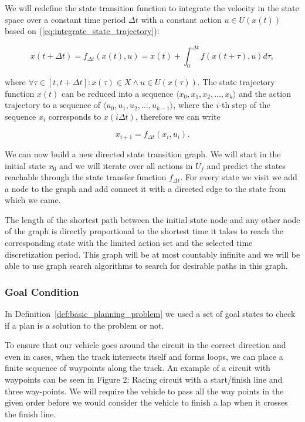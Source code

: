 We will redefine the state transition function to integrate the velocity in the state space over a constant time period $\Delta t$ with a constant action $u\in U(x(t))$ based on (\ref{eq:integrate_state_trajectory}):

\begin{equation}
	x(t+\Delta t)=f_{\Delta t}(x(t), u)=x(t) + \int_{0}^{\Delta t} f\left(x(t+\tau), u \right) d\tau,
\end{equation}

where $\forall \tau \in [t, t+\Delta t]: x(\tau)\in X \wedge u\in U(x(\tau))$. The state trajectory function $x(t)$ can be reduced into a sequence $\langle x_0, x_1, x_2, \ldots, x_k\rangle$ and the action trajectory to a sequence of $\langle u_0, u_1, u_2, \ldots, u_{k-1}\rangle$, where the $i$-th step of the sequence $x_i$ corresponds to $x(i\Delta t)$, therefore we can write

\[
	x_{i+1}=f_{\Delta t}(x_i, u_i).
\]

We can now build a new directed state transition graph. We will start in the initial state $x_0$ and we will iterate over all actions in $U_f$ and predict the states reachable through the state transfer function $f_{\Delta t}$. For every state we visit we add a node to the graph and add connect it with a directed edge to the state from which we came.

The length of the shortest path between the initial state node and any other node of the graph is directly proportional to the shortest time it takes to reach the corresponding state with the limited action set and the selected time discretization period. This graph will be at most countably infinite and we will be able to use graph search algorithms to search for desirable paths in this graph.

\subsubsection{Goal Condition}

In Definition~\ref{def:basic_planning_problem} we used a set of goal states to check if a plan is a solution to the problem or not. 


To ensure that our vehicle goes around the circuit in the correct direction and even in cases, when the track intersects itself and forms loops, we can place a finite sequence of waypoints along the track. An example of a circuit with waypoints can be seen in Figure 2: Racing circuit with a start/finish line and three way-points. 
We will require the vehicle to pass all the way points in the given order before we would consider the vehicle to finish a lap when it crosses the finish line.

